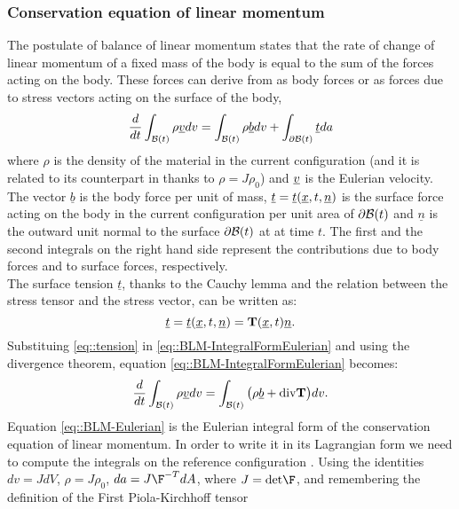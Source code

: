 \subsubsection{Conservation equation of linear momentum}
\label{sct-Conservation} The postulate of balance of linear momentum
states that the rate of change of linear momentum of a fixed mass of
the body is equal to the sum of the forces acting on the body. These
forces can derive from as body forces or as forces due to stress
vectors acting on the surface of the body,
\begin{equation} \frac{d}{dt}\int_{\mathcal{B}(t)}\rho\underline{v} dv =
  \int_{\mathcal{B}(t)}\rho\underline{b}
  dv+\int_{\partial\mathcal{B}(t)}\underline{t}da
  \label{eq::BLM-IntegralFormEulerian}
\end{equation} where $\rho$ is the density of the material in the
current configuration (and it is related to its counterpart in \RefCon
thanks to $\rho=J\rho_0$) and $\underline{v}$ is the Eulerian velocity. The
vector $\underline{b}$ is the body force per unit of mass,
$\underline{t}=\underline{t}(\underline{x},t, \underline{n})$ is the surface
force acting on the body in the current configuration per unit area of
$\partial\mathcal{B}(t)$ and $\underline{n}$ is the outward unit normal to
the surface $\partial\mathcal{B}(t)$ at \npos at time $t$. The first and the
second integrals on the right hand side represent the contributions
due to body forces and to surface forces, respectively.\\ The surface
tension $\underline{t}$, thanks to the Cauchy lemma and the relation
between the stress tensor and the stress vector, can be written as:
\begin{equation} \underline{t}=\underline{t}(\underline{x},t,
  \underline{n})=\textbf{T}(\underline{x},t)\underline{n}.
  \label{eq::tension}
\end{equation} Substituing \eqref{eq::tension} in
\eqref{eq::BLM-IntegralFormEulerian} and using the divergence theorem,
equation \eqref{eq::BLM-IntegralFormEulerian} becomes:
\begin{equation} \frac{d}{dt}\int_{\mathcal{B}(t)}\rho\underline{v} dv =
  \int_{\mathcal{B}(t)}\big(\rho\underline{b} +\text{div}\textbf{T} \big)dv.
  \label{eq::BLM-Eulerian}
\end{equation} Equation \eqref{eq::BLM-Eulerian} is the Eulerian
integral form of the conservation equation of linear momentum. In
order to write it in its Lagrangian form we need to compute the
integrals on the reference configuration \RefCon. Using the identities
$dv=JdV$, $\rho=J\rho_0$, $da=J\F^{-T}dA$, where $J=\text{det}\F$, and
remembering the definition of the First Piola-Kirchhoff tensor
